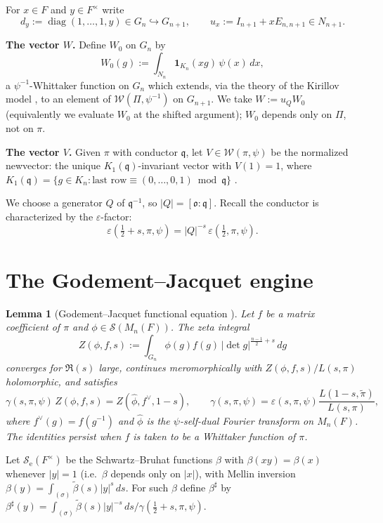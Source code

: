 \documentclass[11pt]{article}
\newcommand{\F}{F}
\newcommand{\oo}{\mathfrak{o}}
\newcommand{\qq}{\mathfrak{q}}
\newcommand{\Mn}{M_n}
\newcommand{\Se}{\mathcal{S}_{\mathrm e}}
\newcommand{\Sw}{\mathcal{S}}
\newcommand{\W}{\mathcal{W}}
\newcommand{\diag}{\operatorname{diag}}
\newcommand{\ttilde}[1]{\widetilde{#1}}
\newtheorem{lemma}{Lemma}
\begin{document}
For $x\in\F$ and $y\in\F^\times$ write
\[
d_y:=\diag(1,\dots,1,y)\in G_n\hookrightarrow G_{n+1},\qquad
u_x:=I_{n+1}+xE_{n,n+1}\in N_{n+1}.
\]

\noindent\textbf{The vector $W$.} Define $W_0$ on $G_n$ by
\begin{equation}\label{eq:W0}
W_0(g):=\int_{N_n}\mathbf 1_{K_n}(xg)\,\psi(x)\,dx,
\end{equation}
a $\psi^{-1}$-Whittaker function on $G_n$ which extends, via the theory of the
Kirillov model \cite{Bernstein}, to an element of $\W(\Pi,\psi^{-1})$ on
$G_{n+1}$. We take $W:=u_Q W_0$ (equivalently we evaluate $W_0$ at the shifted
argument); $W_0$ depends only on $\Pi$, not on $\pi$.

\noindent\textbf{The vector $V$.} Given $\pi$ with conductor $\qq$, let
$V\in\W(\pi,\psi)$ be the normalized newvector: the unique $K_1(\qq)$-invariant
vector with $V(1)=1$, where
$K_1(\qq)=\{g\in K_n:\text{last row}\equiv(0,\dots,0,1)\bmod\qq\}$
\cite{JPSS81,Matringe}.

We choose a generator $Q$ of $\qq^{-1}$, so $|Q|=[\oo:\qq]$. Recall the
conductor is characterized by the $\varepsilon$-factor:
\begin{equation}\label{eq:eps}
\varepsilon(\tfrac12+s,\pi,\psi)=|Q|^{-s}\,\varepsilon(\tfrac12,\pi,\psi).
\end{equation}

\section*{The Godement--Jacquet engine}

\begin{lemma}[Godement--Jacquet functional equation \cite{GJ72}]\label{lem:GJ}
Let $f$ be a matrix coefficient of $\pi$ and $\phi\in\Sw(\Mn(\F))$. The zeta
integral
\[
Z(\phi,f,s):=\int_{G_n}\phi(g)f(g)\,|\det g|^{\frac{n-1}{2}+s}\,dg
\]
converges for $\Re(s)$ large, continues meromorphically with
$Z(\phi,f,s)/L(s,\pi)$ holomorphic, and satisfies
\[
\gamma(s,\pi,\psi)\,Z(\phi,f,s)=Z(\widehat\phi,f^\vee,1-s),\qquad
\gamma(s,\pi,\psi)=\varepsilon(s,\pi,\psi)\frac{L(1-s,\ttilde\pi)}{L(s,\pi)},
\]
where $f^\vee(g)=f(g^{-1})$ and $\widehat\phi$ is the $\psi$-self-dual Fourier
transform on $\Mn(\F)$. The identities persist when $f$ is taken to be a
Whittaker function of $\pi$.
\end{lemma}

Let $\Se(\F^\times)$ be the Schwartz--Bruhat functions $\beta$ with
$\beta(xy)=\beta(x)$ whenever $|y|=1$ (i.e.\ $\beta$ depends only on $|x|$),
with Mellin inversion $\beta(y)=\int_{(\sigma)}\tilde\beta(s)|y|^s\,ds$. For such
$\beta$ define $\beta^\sharp$ by
$\beta^\sharp(y)=\int_{(\sigma)}\tilde\beta(s)|y|^{-s}\,ds/\gamma(\tfrac12+s,\pi,\psi)$.
\end{document}
